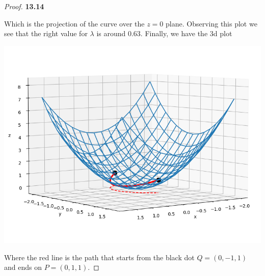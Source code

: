\documentclass[11pt]{article}
\theoremstyle{definition}
\begin{document}
\begin{proof}{\textbf{13.14}}
\begin{center}
    \end{center}
    Which is the projection of the curve over the $z=0$ plane. Observing this
    plot we see that the right value for $\lambda$ is around 0.63.
    Finally, we have the 3d plot 
    \begin{center}
        \includegraphics[scale=0.5]{ch13-14.png}
    \end{center}
    Where the red line is the path that starts from the black dot
    $Q = (0, -1, 1)$ and ends on $P = (0, 1, 1)$.
\end{proof}
\cleardoublepage
\end{document}
